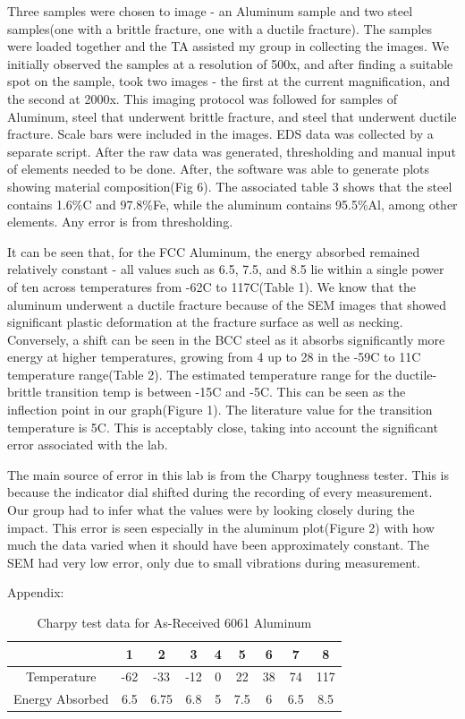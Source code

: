 \documentclass{article}
\begin{document}
Three samples were chosen to image - an Aluminum sample and two steel samples(one with a brittle fracture, one with a ductile fracture). The samples were loaded together and the TA assisted my group in collecting the images. We initially observed the samples at a resolution of 500x, and after finding a suitable spot on the sample, took two images - the first at the current magnification, and the second at 2000x. This imaging protocol was followed for samples of Aluminum, steel that underwent brittle fracture, and steel that underwent ductile fracture. Scale bars were included in the images. EDS data was collected by a separate script. After the raw data was generated, thresholding and manual input of elements needed to be done. After, the software was able to generate plots showing material composition(Fig 6). The associated table 3 shows that the steel contains 1.6\%C and 97.8\%Fe, while the aluminum contains 95.5\%Al, among other elements. Any error is from thresholding.

It can be seen that, for the FCC Aluminum, the energy absorbed remained relatively constant - all values such as 6.5, 7.5, and 8.5 lie within a single power of ten across temperatures from -62C to 117C(Table 1). We know that the aluminum underwent a ductile fracture because of the SEM images that showed significant plastic deformation at the fracture surface as well as necking. Conversely, a shift can be seen in the BCC steel as it absorbs significantly more energy at higher temperatures, growing from 4 up to 28 in the -59C to 11C temperature range(Table 2). The estimated temperature range for the ductile-brittle transition temp is between -15C and -5C. This can be seen as the inflection point in our graph(Figure 1). The literature value for the transition temperature is 5C. This is acceptably close, taking into account the significant error associated with the lab.

The main source of error in this lab is from the Charpy toughness tester. This is because the indicator dial shifted during the recording of every measurement. Our group had to infer what the values were by looking closely during the impact. This error is seen especially in the aluminum plot(Figure 2) with how much the data varied when it should have been approximately constant. The SEM had very low error, only due to small vibrations during measurement.

\clearpage

Appendix:\\

\begin{table}[h]
\centering
\caption{Charpy test data for As-Received 6061 Aluminum}
\begin{tabular}{||c | c | c | c | c | c | c | c | c||}
	\hline
	\ 							& 1 & 2 & 3 & 4 & 5 & 6 & 7 & 8\\
	\hline \hline
	Temperature		& -62 & -33 & -12 & 0 & 22 & 38 & 74 & 117\\
	Energy Absorbed& 6.5 & 6.75 & 6.8 & 5 & 7.5 & 6 & 6.5 & 8.5\\
	\hline
\end{tabular}
\end{table}
\end{document}

